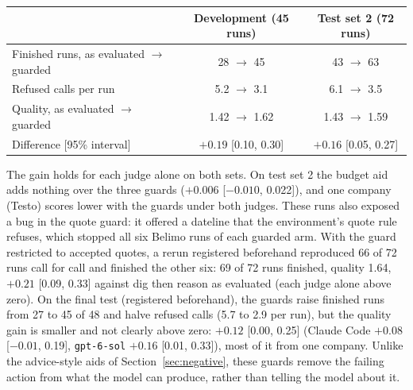 \begin{center}
\begin{tabular}{lcc}
\toprule
 & Development (45 runs) & Test set 2 (72 runs)\\
\midrule
Finished runs, as evaluated $\rightarrow$ guarded & 28 $\rightarrow$ 45 & 43 $\rightarrow$ 63\\
Refused calls per run & 5.2 $\rightarrow$ 3.1 & 6.1 $\rightarrow$ 3.5\\
Quality, as evaluated $\rightarrow$ guarded & 1.42 $\rightarrow$ 1.62 & 1.43 $\rightarrow$ 1.59\\
Difference [95\% interval] & $+0.19$ [0.10, 0.30] & $+0.16$ [0.05, 0.27]\\
\bottomrule
\end{tabular}
\end{center}

The gain holds for each judge alone on both sets. On test set 2 the budget aid adds nothing over the three guards
($+0.006$ [$-0.010$, 0.022]), and one company (Testo) scores lower with the guards under both judges. These runs
also exposed a bug in the quote guard: it offered a dateline that the environment's quote rule refuses, which stopped
all six Belimo runs of each guarded arm. With the guard restricted to accepted quotes, a rerun registered beforehand
reproduced 66 of 72 runs call for call and finished the other six: 69 of 72 runs finished, quality 1.64, $+0.21$
[0.09, 0.33] against dig then reason as evaluated (each judge alone above zero). On the final test (registered
beforehand), the guards raise finished runs from 27 to 45 of 48 and halve refused calls (5.7 to 2.9
per run), but the quality gain is smaller and not clearly above zero: $+0.12$ [0.00, 0.25] (Claude Code $+0.08$
[$-0.01$, 0.19], \texttt{gpt-6-sol} $+0.16$ [0.01, 0.33]), most of it from one company. Unlike the
advice-style aids of Section~\ref{sec:negative}, these guards remove the failing action from what the model can
produce, rather than telling the model about it.

